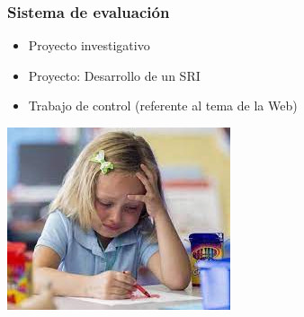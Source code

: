 \documentclass[
	10pt, %
	aspectratio=169, %
]{beamer}
\begin{document}
\begin{frame}[fragile]
		
	\frametitle{Sistema de evaluación}
	
	\noindent\begin{minipage}{.4\textwidth}
		\centering
		\begin{itemize}
			\item Proyecto investigativo \\[2mm]
			\item Proyecto: Desarrollo de un SRI \\[2mm]
			\item Trabajo de control (referente al tema de la Web)
		\end{itemize}
		
	\end{minipage}%
	\begin{minipage}{.7\textwidth}
		\centering
		\includegraphics[scale=1]{nina-llorando.jpeg} 
	\end{minipage}

\end{frame}

\end{document}

